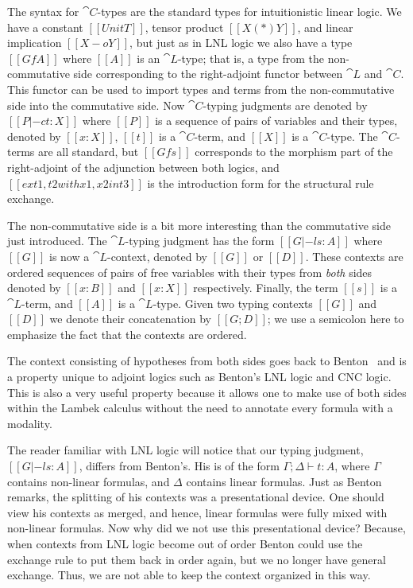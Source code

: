 The syntax for $\cat{C}$-types are the standard types for
intuitionistic linear logic.  We have a constant $[[UnitT]]$, tensor
product $[[X (*) Y]]$, and linear implication $[[X -o Y]]$, but just
as in LNL logic we also have a type $[[Gf A]]$ where $[[A]]$ is an
$\cat{L}$-type; that is, a type from the non-commutative side
corresponding to the right-adjoint functor between $\cat{L}$ and
$\cat{C}$. This functor can be used to import types and terms from the
non-commutative side into the commutative side.  Now $\cat{C}$-typing
judgments are denoted by $[[P |-c t : X]]$ where $[[P]]$ is a sequence
of pairs of variables and their types, denoted by $[[x : X]]$, $[[t]]$
is a $\cat{C}$-term, and $[[X]]$ is a $\cat{C}$-type.  The
$\cat{C}$-terms are all standard, but $[[Gf s]]$ corresponds to the
morphism part of the right-adjoint of the adjunction between both
logics, and $[[ex t1 , t2 with x1 , x2 in t3]]$ is the introduction
form for the structural rule exchange.

The non-commutative side is a bit more interesting than the
commutative side just introduced.  The $\cat{L}$-typing judgment has
the form $[[G |-l s : A]]$ where $[[G]]$ is now a $\cat{L}$-context,
denoted by $[[G]]$ or $[[D]]$. These contexts are ordered sequences of
pairs of free variables with their types from \emph{both} sides
denoted by $[[x : B]]$ and $[[x : X]]$ respectively. Finally, the term
$[[s]]$ is a $\cat{L}$-term, and $[[A]]$ is a $\cat{L}$-type.  Given
two typing contexts $[[G]]$ and $[[D]]$ we denote their concatenation
by $[[G;D]]$; we use a semicolon here to emphasize the fact that the
contexts are ordered.

The context consisting of hypotheses from both sides goes back to
Benton~\cite{Benton:1994} and is a property unique to adjoint logics
such as Benton's LNL logic and CNC logic.  This is also a very useful
property because it allows one to make use of both sides within the
Lambek calculus without the need to annotate every formula with a
modality.

The reader familiar with LNL logic will notice that our typing
judgment, $[[G |-l s : A]]$, differs from Benton's. His is of the form
$\Gamma;\Delta \vdash t : A$, where $\Gamma$ contains non-linear
formulas, and $\Delta$ contains linear formulas.  Just as Benton
remarks, the splitting of his contexts was a presentational device.
One should view his contexts as merged, and hence, linear formulas
were fully mixed with non-linear formulas.  Now why did we not use
this presentational device?  Because, when contexts from LNL logic
become out of order Benton could use the exchange rule to put them
back in order again, but we no longer have general exchange. Thus, we
are not able to keep the context organized in this way.

